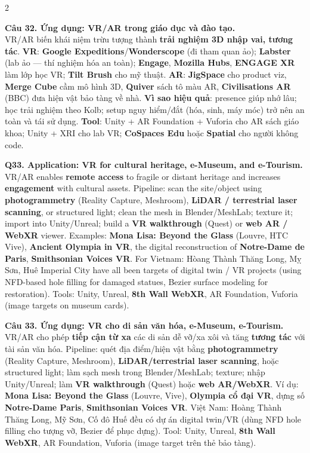 \begin{paracol}{2}
\switchcolumn

\textbf{Câu 32. Ứng dụng: VR/AR trong giáo dục và đào tạo.}\\
VR/AR biến khái niệm trừu tượng thành \textbf{trải nghiệm 3D nhập vai, tương tác}. \textbf{VR}: \textbf{Google Expeditions}/\textbf{Wonderscope} (đi tham quan ảo); \textbf{Labster} (lab ảo --- thí nghiệm hóa an toàn); \textbf{Engage}, \textbf{Mozilla Hubs}, \textbf{ENGAGE XR} làm lớp học VR; \textbf{Tilt Brush} cho mỹ thuật. \textbf{AR}: \textbf{JigSpace} cho product viz, \textbf{Merge Cube} cầm mô hình 3D, \textbf{Quiver} sách tô màu AR, \textbf{Civilisations AR} (BBC) đưa hiện vật bảo tàng về nhà. \textbf{Vì sao hiệu quả}: presence giúp nhớ lâu; học trải nghiệm theo Kolb; setup nguy hiểm/đắt (hóa, sinh, máy móc) trở nên an toàn và tái sử dụng. \textbf{Tool}: Unity + AR Foundation + Vuforia cho AR sách giáo khoa; Unity + XRI cho lab VR; \textbf{CoSpaces Edu} hoặc \textbf{Spatial} cho người không code.

\switchcolumn*

\textbf{Q33. Application: VR for cultural heritage, e-Museum, and e-Tourism.}\\
VR/AR enables \textbf{remote access} to fragile or distant heritage and increases \textbf{engagement} with cultural assets. Pipeline: scan the site/object using \textbf{photogrammetry} (Reality Capture, Meshroom), \textbf{LiDAR / terrestrial laser scanning}, or structured light; clean the mesh in Blender/MeshLab; texture it; import into Unity/Unreal; build a \textbf{VR walkthrough} (Quest) or \textbf{web AR / WebXR} viewer. Examples: \textbf{Mona Lisa: Beyond the Glass} (Louvre, HTC Vive), \textbf{Ancient Olympia in VR}, the digital reconstruction of \textbf{Notre-Dame de Paris}, \textbf{Smithsonian Voices VR}. For Vietnam: H{\`o}ang Th{\`a}nh Thăng Long, M\d{y} Sơn, Hu\^{e} Imperial City have all been targets of digital twin / VR projects (using NFD-based hole filling for damaged statues, Bezier surface modeling for restoration). Tools: Unity, Unreal, \textbf{8th Wall WebXR}, AR Foundation, Vuforia (image targets on museum cards).

\switchcolumn

\textbf{Câu 33. Ứng dụng: VR cho di sản văn hóa, e-Museum, e-Tourism.}\\
VR/AR cho phép \textbf{tiếp cận từ xa} các di sản dễ vỡ/xa xôi và tăng \textbf{tương tác} với tài sản văn hóa. Pipeline: quét địa điểm/hiện vật bằng \textbf{photogrammetry} (Reality Capture, Meshroom), \textbf{LiDAR/terrestrial laser scanning}, hoặc structured light; làm sạch mesh trong Blender/MeshLab; texture; nhập Unity/Unreal; làm \textbf{VR walkthrough} (Quest) hoặc \textbf{web AR/WebXR}. Ví dụ: \textbf{Mona Lisa: Beyond the Glass} (Louvre, Vive), \textbf{Olympia cổ đại VR}, dựng số \textbf{Notre-Dame Paris}, \textbf{Smithsonian Voices VR}. Việt Nam: Hoàng Thành Thăng Long, Mỹ Sơn, Cố đô Huế đều có dự án digital twin/VR (dùng NFD hole filling cho tượng vỡ, Bezier để phục dựng). Tool: Unity, Unreal, \textbf{8th Wall WebXR}, AR Foundation, Vuforia (image target trên thẻ bảo tàng).


\end{paracol}
